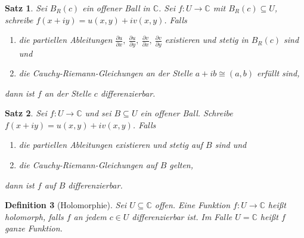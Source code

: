 \documentclass[a4paper,12pt]{book}
\theoremstyle{newthm}
\newtheorem{thm}{Satz}[section]
\theoremstyle{newdef}
\newtheorem{defn}[thm]{Definition}
\theoremstyle{newrem}
\newcommand{\C}{\mathbb{C}}
\newcommand{\del}{\partial}
\begin{document}
		\begin{thm}
			Sei $ B_R(c) $ ein offener Ball in $\C$. Sei $ f: U \to \C $ mit $ B_R(c) \subseteq U $, schreibe $ f(x+iy) = u(x,y) + iv(x,y) $. Falls 
			\begin{enumerate}[label={\roman*})]
				\item die partiellen Ableitungen $ \frac{\del u}{\del x},\ \frac{\del u}{\del y},\ \frac{\del v}{\del x},\ \frac{\del v}{\del y} $ existieren und stetig in $ B_R(c) $ sind und
				\item die Cauchy-Riemann-Gleichungen an der Stelle $ a+ib \cong (a,b) $ erfüllt sind,
			\end{enumerate}
			dann ist $f$ an der Stelle $c$ differenzierbar.
		\end{thm}
		
		\begin{thm}
			Sei $ f: U \to \C $ und sei $ B \subseteq U $ ein offener Ball. Schreibe $ f(x+iy) = u(x,y) + iv(x,y) $. Falls 
			\begin{enumerate}[label={\roman*})]
				\item die partiellen Ableitungen existieren und stetig auf $B$ sind und
				\item die Cauchy-Riemann-Gleichungen auf $B$ gelten,
			\end{enumerate}
			dann ist $f$ auf $B$ differenzierbar.
		\end{thm}
		
		\begin{defn}[Holomorphie]
			Sei $U \subseteq \C$ offen. Eine Funktion $ f: U \to \C $ heißt \emph{holomorph}, falls $f$ an jedem $ c \in U $ differenzierbar ist. Im Falle $ U = \C $ heißt $f$ \emph{ganze Funktion}.
		\end{defn}
		
\end{document}
